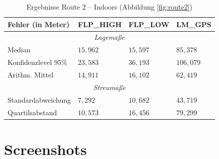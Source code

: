 \begin{table}[h!]
	\centering
	\caption{Ergebnisse Route 2 -- Indoors (Abbildung \ref{fig:route2})}
	\begin{tabular}{|l|l|l|l|}
	\hline
	Fehler (in Meter) & FLP\_HIGH & FLP\_LOW & LM\_GPS \\
	\hline
	\multicolumn{4}{|c|}{\textit{Lagemaße}}\\
	\hline
	Median & $15,962$ & $15,597$ & $85,378$ \\
	Konfidenzlevel 95\% & $23,583$ & $36,193$ & $106,079$ \\
	Arithm. Mittel & $14,911$ & $16,102$ & $62,419$ \\
	\hline
	\multicolumn{4}{|c|}{\textit{Streumaße}}\\
	\hline
	Standardabweichung & $7,292$ & $10,682$ & $43,719$ \\
	Quartilsabstand & $10,573$ & $16,456$ & $79,299$ \\
	\hline
	\end{tabular}
\end{table}

\section{Screenshots}

